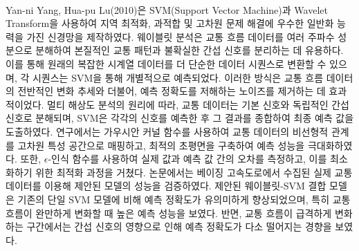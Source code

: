 \documentclass[11pt]{report}
\begin{document}
\\
\indent Yan-ni Yang, Hua-pu Lu(2010)은 SVM(Support Vector Machine)과 Wavelet Transform을 사용하여 지역 최적화, 과적합 및 고차원 문제 해결에 우수한 일반화 능력을 가진 신경망을 제작하였다. 
웨이블릿 분석은 교통 흐름 데이터를 여러 주파수 성분으로 분해하여 본질적인 교통 패턴과 불확실한 간섭 신호를 분리하는 데 유용하다. 
이를 통해 원래의 복잡한 시계열 데이터를 더 단순한 데이터 시퀀스로 변환할 수 있으며, 각 시퀀스는 SVM을 통해 개별적으로 예측되었다. 
이러한 방식은 교통 흐름 데이터의 전반적인 변화 추세와 더불어, 예측 정확도를 저해하는 노이즈를 제거하는 데 효과적이었다. 
멀티 해상도 분석의 원리에 따라, 교통 데이터는 기본 신호와 독립적인 간섭 신호로 분해되며, SVM은 각각의 신호를 예측한 후 그 결과를 종합하여 최종 예측 값을 도출하였다. 
연구에서는 가우시안 커널 함수를 사용하여 교통 데이터의 비선형적 관계를 고차원 특성 공간으로 매핑하고, 최적의 초평면을 구축하여 예측 성능을 극대화하였다. 
또한, $\epsilon$-인식 함수를 사용하여 실제 값과 예측 값 간의 오차를 측정하고, 이를 최소화하기 위한 최적화 과정을 거쳤다. 
논문에서는 베이징 고속도로에서 수집된 실제 교통 데이터를 이용해 제안된 모델의 성능을 검증하였다. 
제안된 웨이블릿-SVM 결합 모델은 기존의 단일 SVM 모델에 비해 예측 정확도가 유의미하게 향상되었으며, 특히 교통 흐름이 완만하게 변화할 때 높은 예측 성능을 보였다. 
반면, 교통 흐름이 급격하게 변화하는 구간에서는 간섭 신호의 영향으로 인해 예측 정확도가 다소 떨어지는 경향을 보였다. 
\end{document}
